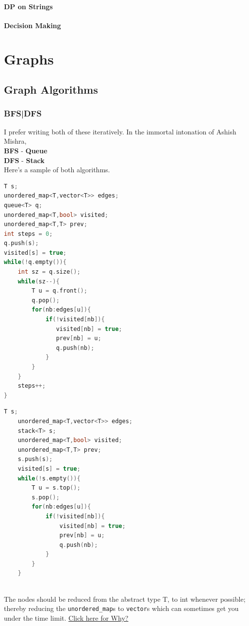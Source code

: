 \documentclass{report}
\begin{document}
\subsubsection{DP on Strings}
\subsubsection{Decision Making}
\chapter{Graphs}
\section{Graph Algorithms}
\subsection{BFS|DFS}
I prefer writing both of these iteratively. In the immortal
intonation of Ashish Mishra,\\
\textbf{BFS} - \textbf{Queue}\\
\textbf{DFS} - \textbf{Stack}\\
Here's a sample of both algorithms.\\
\noindent\begin{minipage}{.45\textwidth}
    \begin{lstlisting}[caption=BFS,language=C++]
T s;
unordered_map<T,vector<T>> edges;
queue<T> q;
unordered_map<T,bool> visited;
unordered_map<T,T> prev;
int steps = 0;
q.push(s);
visited[s] = true;
while(!q.empty()){
    int sz = q.size();
    while(sz--){
        T u = q.front();
        q.pop();
        for(nb:edges[u]){
            if(!visited[nb]){
               visited[nb] = true;
               prev[nb] = u;
               q.push(nb);
            }
        }
    }
    steps++;
}
        \end{lstlisting}
\end{minipage}\hfill
\begin{minipage}{.45\textwidth}
    \begin{lstlisting}[caption=DFS,language=C++]
    T s;
    unordered_map<T,vector<T>> edges;
    stack<T> s;
    unordered_map<T,bool> visited;
    unordered_map<T,T> prev;
    s.push(s);
    visited[s] = true;
    while(!s.empty()){
        T u = s.top();
        s.pop();
        for(nb:edges[u]){
            if(!visited[nb]){
                visited[nb] = true;
                prev[nb] = u;
                q.push(nb);
            }
        }
    }
    \end{lstlisting}
\end{minipage}\\
The nodes should be reduced from the abstract type T, to
int whenever possible; thereby reducing the
\texttt{unordered\_map}s to \texttt{vector}s which can
sometimes get you under the time limit.
\href{https://stackoverflow.com/questions/55451825/why-is-vector-faster-than-unordered-map}{Click here for Why?}
\end{document}

